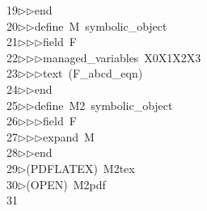 \begin{tabbing}
19\>$\triangleright$\>$\triangleright$\>end\ \\[0pt]
20\>$\triangleright$\>$\triangleright$\>define\ M\ symbolic\_object\ \\[0pt]
21\>$\triangleright$\>$\triangleright$\>$\triangleright$\>field\ F\ \\[0pt]
22\>$\triangleright$\>$\triangleright$\>$\triangleright$\>managed\_variables\ X0X1X2X3\ \\[0pt]
23\>$\triangleright$\>$\triangleright$\>$\triangleright$\>text\ (F\_abcd\_eqn)\ \\[0pt]
24\>$\triangleright$\>$\triangleright$\>end\ \\[0pt]
25\>$\triangleright$\>$\triangleright$\>define\ M2\ symbolic\_object\ \\[0pt]
26\>$\triangleright$\>$\triangleright$\>$\triangleright$\>field\ F\ \\[0pt]
27\>$\triangleright$\>$\triangleright$\>$\triangleright$\>expand\ M\ \\[0pt]
28\>$\triangleright$\>$\triangleright$\>end\\[0pt]
29\>$\triangleright$\>(PDFLATEX)\ M2tex\\[0pt]
30\>$\triangleright$\>(OPEN)\ M2pdf\\[0pt]
31\>\end{tabbing}
